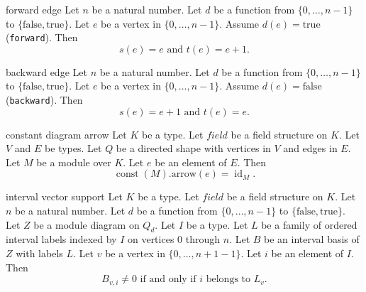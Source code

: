 \begin{cleanresult}{forward edge}
Let $n$ be a natural number.
Let $d$ be a function from $\{0,\ldots,n-1\}$ to $\{\mathrm{false},\mathrm{true}\}$.
Let $e$ be a vertex in $\{0,\ldots,n-1\}$.
Assume $d(e) = \mathrm{true}$ (\texttt{forward}).
Then \[s(e) = e \text{ and } t(e) = e+1.\]
\end{cleanresult}

\begin{cleanresult}{backward edge}
Let $n$ be a natural number.
Let $d$ be a function from $\{0,\ldots,n-1\}$ to $\{\mathrm{false},\mathrm{true}\}$.
Let $e$ be a vertex in $\{0,\ldots,n-1\}$.
Assume $d(e) = \mathrm{false}$ (\texttt{backward}).
Then \[s(e) = e+1 \text{ and } t(e) = e.\]
\end{cleanresult}

\begin{cleanresult}{constant diagram arrow}
Let $K$ be a type.
Let $\mathit{field}$ be a field structure on $K$.
Let $V$ and $E$ be types.
Let $Q$ be a directed shape with vertices in $V$ and edges in $E$.
Let $M$ be a module over $K$.
Let $e$ be an element of $E$.
Then \[\operatorname{const}(M).\mathrm{arrow}(e) = \operatorname{id}_{M}.\]
\end{cleanresult}

\begin{cleanresult}{interval vector support}
Let $K$ be a type.
Let $\mathit{field}$ be a field structure on $K$.
Let $n$ be a natural number.
Let $d$ be a function from $\{0,\ldots,n-1\}$ to $\{\mathrm{false},\mathrm{true}\}$.
Let $Z$ be a module diagram on $Q_{d}$.
Let $I$ be a type.
Let $L$ be a family of ordered interval labels indexed by $I$ on vertices $0$ through $n$.
Let $B$ be an interval basis of $Z$ with labels $L$.
Let $v$ be a vertex in $\{0,\ldots,n + 1-1\}$.
Let $i$ be an element of $I$.
Then \[B_{v,i} \ne 0 \text{ if and only if } i \text{ belongs to } L_{v}.\]
\par{}
\end{cleanresult}

